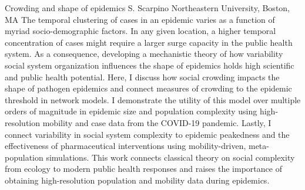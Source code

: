 
    \begin{abstract_online}{Crowding and shape of epidemics}{%
        S. Scarpino}{%
        }{%
        Northeastern University, Boston, MA}
    The temporal clustering of cases in an epidemic varies as a function of myriad socio-demographic factors. In any given location, a higher temporal concentration of cases might require a larger surge capacity in the public health system. As a consequence, developing a mechanistic theory of how variability social system organization influences the shape of epidemics holds high scientific and public health potential. Here, I discuss how social crowding impacts the shape of pathogen epidemics and connect measures of crowding to the epidemic threshold in network models. I demonstrate the utility of this model over multiple orders of magnitude in epidemic size and population complexity using high-resolution mobility and case data from the COVID-19 pandemic. Lastly, I connect variability in social system complexity to epidemic peakedness and the effectiveness of pharmaceutical interventions using mobility-driven, meta-population simulations. This work connects classical theory on social complexity from ecology to modern public health responses and raises the importance of obtaining high-resolution population and mobility data during epidemics. 
    
    \end{abstract_online}
    